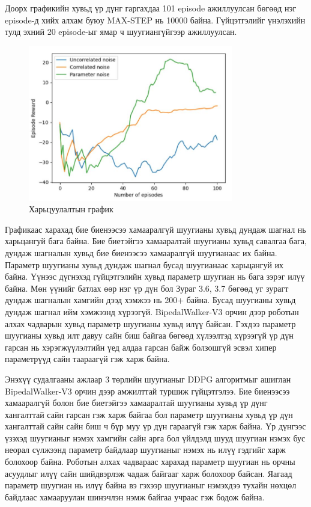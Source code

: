 \documentclass[12pt,A4]{report}
\begin{document}
Доорх графикийн хувьд үр дүнг гаргахдаа 101 episode ажиллуулсан бөгөөд нэг episode-д хийх алхам буюу MAX-STEP нь 10000 байна. Гүйцэтгэлийг үнэлэхийн тулд эхний 20 episode-ыг ямар ч шуугиангүйгээр ажиллуулсан. 

\begin{figure}[H]
\centering
\includegraphics[width=0.8\textwidth]{./images/comperation-4}
\caption{Харьцуулалтын график}
\end{figure}

Графикаас харахад бие биенээсээ хамааралгүй шуугианы хувьд дундаж шагнал нь харьцангуй бага байна. Бие биетэйгээ хамааралтай шуугианы хувьд савалгаа бага, дундаж шагналын хувьд бие биенээсээ хамааралгүй шуугианаас их байна. Параметр шуугианы хувьд дундаж шагнал бусад шуугианаас харьцангуй их байна. Үүнээс дүгнэхэд гүйцэтгэлийн хувьд параметр шуугиан нь бага зэрэг илүү байна. Мөн үүнийг батлах өөр нэг үр дүн бол Зураг 3.6, 3.7 бөгөөд уг зурагт дундаж шагналын хамгийн дээд хэмжээ нь 200+ байна. Бусад шуугианы хувьд дундаж шагнал ийм хэмжээнд хүрээгүй. BipedalWalker-V3 орчин дээр роботын алхах чадварын хувьд параметр шуугианы хувьд илүү байсан. Гэхдээ параметр шуугианы хувьд илт давуу сайн биш байгаа бөгөөд хүлээлтэд хүрээгүй үр дүн гарсан нь хэрэгжүүлэлтийн үед алдаа гарсан байж болзошгүй эсвэл хипер параметрүүд сайн таараагүй гэж харж байна.


Энэхүү судалгааны ажлаар 3 төрлийн шуугианыг DDPG алгоритмыг ашиглан BipedalWalker-V3 орчин дээр амжилттай туршиж гүйцэтгэлээ. Бие биенээсээ хамааралгүй болон бие биетэйгээ хамааралтай шуугианы хувьд үр дүнг хангалттай сайн гарсан гэж харж байгаа бол параметр шуугианы хувьд үр дүн хангалттай сайн сайн биш ч бүр муу үр дүн гараагүй гэж харж байна. Үр дүнгээс үзэхэд шуугианыг нэмэх хамгийн сайн арга бол үйлдэлд шууд шуугиан нэмэх бус неорал сүлжээнд параметр байдлаар шуугианыг нэмэх нь илүү гэдгийг харж болохоор байна. Роботын алхах чадвараас харахад параметр шуугиан нь орчны асуудлыг илүү сайн шийдвэрлэж чадаж байгааг харж болохоор байсан. Яагаад параметр шуугиан нь илүү байна вэ гэхээр шуугианыг нэмэхдээ тухайн нөхцөл байдлаас хамааруулан шинэчлэн нэмж байгаа учраас гэж бодож байна. 
\end{document}
